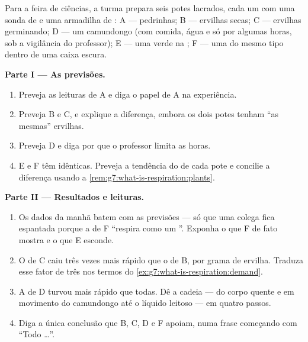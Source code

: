 \begin{problem}\label{pb:g7:what-is-respiration:1}
Para a feira de ciências, a turma prepara seis potes lacrados, cada um
com uma sonda de  e uma armadilha de : A ---
pedrinhas; B --- ervilhas secas; C --- ervilhas germinando; D --- um
camundongo (com comida, água e só por algumas horas, sob a vigilância
do professor); E --- uma  verde na ; F --- uma  do mesmo
tipo dentro de uma caixa escura.

\medskip\noindent\textbf{Parte I --- As previsões.}
\begin{enumerate}
  \item Preveja as leituras de A e diga o papel de A na experiência.
  \item Preveja B e C, e explique a diferença, embora os dois potes
        tenham ``as mesmas'' ervilhas.
  \item Preveja D e diga por que o professor limita as horas.
  \item E e F têm  idênticas. Preveja a tendência do 
        de cada pote e concilie a diferença usando a
        \cref{rem:g7:what-is-respiration:plants}.
\end{enumerate}

\medskip\noindent\textbf{Parte II --- Resultados e leituras.}
\begin{enumerate}[resume]
  \item Os dados da manhã batem com as previsões --- só que uma colega
        fica espantada porque a  de F ``respira como um
        ''. Exponha o que F de fato mostra e o que E esconde.
  \item O  de C caiu três vezes mais rápido que o de B, por
        grama de ervilha. Traduza esse fator de três nos termos do
        \cref{ex:g7:what-is-respiration:demand}.
  \item A  de D turvou mais rápido que todas. Dê a cadeia
        --- do corpo quente e em movimento do camundongo até o líquido
        leitoso --- em quatro passos.
  \item Diga a única conclusão que B, C, D e F apoiam, numa frase
        começando com ``Todo \dots''.
\end{enumerate}


\end{problem}

